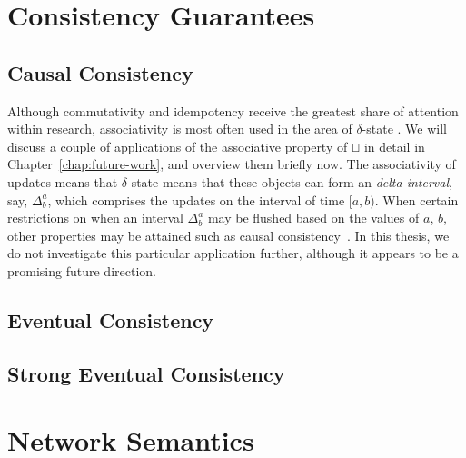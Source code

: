 \section{Consistency Guarantees}
\subsection{Causal Consistency}
Although commutativity and idempotency receive the greatest share of attention
within \CRDT research, associativity is most often used in the area of
$\delta$-state \CRDTs. We will discuss a couple of applications of the
associative property of $\sqcup$ in detail in Chapter~\ref{chap:future-work},
and overview them briefly now. The associativity of updates means that
$\delta$-state \CRDTs means that these objects can form an \emph{delta interval},
say, $\Delta^a_b$, which comprises the updates on the interval of time $[a,b)$.
When certain restrictions on when an interval $\Delta^a_b$ may be flushed based
on the values of $a$, $b$, other properties may be attained such as causal
consistency~\citep{almedia18}. In this thesis, we do not investigate this
particular application further, although it appears to be a promising future
direction.

\subsection{Eventual Consistency}
\subsection{Strong Eventual Consistency}
\section{Network Semantics}
